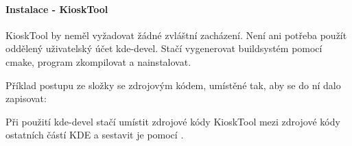 \paragraph{Instalace - KioskTool}
KioskTool by neměl vyžadovat žádné zvláštní zacházení. Není ani potřeba použít oddělený uživatelský účet kde-devel. Stačí vygenerovat buildsystém pomocí cmake, program zkompilovat a nainstalovat.

Příklad postupu ze složky se zdrojovým kódem, umístěné tak, aby se do ní dalo zapisovat:

\noindent
{}

\noindent
{}

\noindent
{}

\noindent
{}

Při použití kde-devel stačí umístit zdrojové kódy KioskTool mezi zdrojové kódy ostatních částí KDE a sestavit je pomocí .
